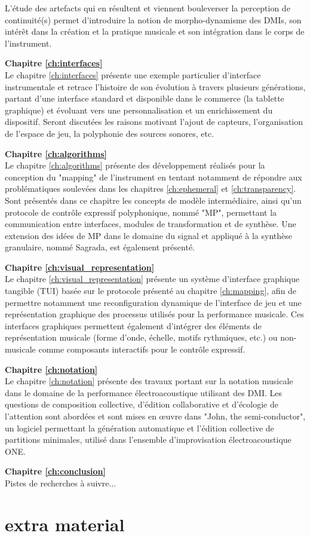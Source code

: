 L'étude des artefacts qui en résultent et viennent bouleverser la perception de continuité(s) permet d'introduire la notion de morpho-dynamisme des DMIs, son intérêt dans la création et la pratique musicale et son intégration dans le corps de l'instrument.

\textbf{Chapitre \ref{ch:interfaces}} \\[0.2em]
Le chapitre \ref{ch:interfaces} présente une exemple particulier d'interface instrumentale et retrace l'histoire de son évolution à travers plusieurs générations, partant d'une interface standard et disponible dans le commerce (la tablette graphique) et évoluant vers une personnalisation et un enrichissement du dispositif. 
Seront discutées les raisons motivant l'ajout de capteurs, l'organisation de l'espace de jeu, la polyphonie des sources sonores, etc.

\textbf{Chapitre \ref{ch:algorithms}} \\[0.2em]
Le chapitre \ref{ch:algorithms} présente des développement réalisés pour la conception du "mapping" de l'instrument en tentant notamment de répondre aux problématiques soulevées dans les chapitres \ref{ch:ephemeral} et \ref{ch:transparency}. Sont présentés dans ce chapitre les concepts de modèle intermédiaire, ainsi qu'un protocole de contrôle expressif polyphonique, nommé "MP", permettant la communication entre interfaces, modules de transformation et de synthèse. Une extension des idées de MP dans le domaine du signal et appliqué à la synthèse granulaire, nommé Sagrada, est également présenté.

\textbf{Chapitre \ref{ch:visual_representation}} \\[0.2em]
Le chapitre \ref{ch:visual_representation} présente un système d'interface graphique tangible (TUI) basée sur le protocole présenté au chapitre  \ref{ch:mapping}, afin de permettre notamment une reconfiguration dynamique de l'interface de jeu et une représentation graphique des processus utilisés pour la performance musicale. Ces interfaces graphiques permettent également d'intégrer des éléments de représentation musicale (forme d'onde, échelle, motifs rythmiques, etc.) ou non-musicale comme composants interactifs pour le contrôle expressif.

\textbf{Chapitre \ref{ch:notation}} \\[0.2em]
Le chapitre \ref{ch:notation} présente des travaux portant sur la notation musicale dans le domaine de la performance électroacoustique utilisant des DMI. Les questions de composition collective, d'édition collaborative et d'écologie de l'attention sont abordées et sont mises en œuvre dans "John, the semi-conductor", un logiciel permettant la génération automatique et l'édition collective de partitions minimales, utilisé dans l'ensemble d'improvisation électroacoustique ONE. 

\textbf{Chapitre \ref{ch:conclusion}} \\[0.2em]
Pistes de recherches à suivre...


\section*{extra material}
